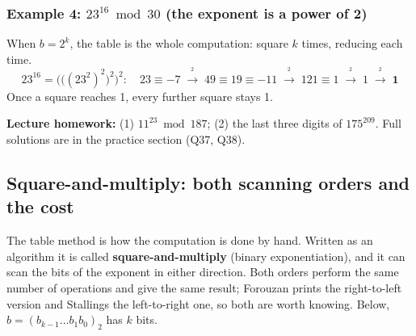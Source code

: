 \subsubsection*{Example 4: $23^{16} \bmod 30$ (the exponent is a power of 2)}
When $b = 2^k$, the table is the whole computation: square $k$ times, reducing each time.
\[
23^{16} = \Big(\big((23^2)^2\big)^2\Big)^2:\quad 23 \equiv -7 \;\xrightarrow{\;^2\;}\; 49 \equiv 19 \equiv -11 \;\xrightarrow{\;^2\;}\; 121 \equiv 1 \;\xrightarrow{\;^2\;}\; 1 \;\xrightarrow{\;^2\;}\; \mathbf{1}
\]
Once a square reaches 1, every further square stays 1.

\textbf{Lecture homework:} (1) $11^{23} \bmod 187$; (2) the last three digits of $175^{209}$. Full solutions are in the practice section (Q37, Q38).

\subsection{Square-and-multiply: both scanning orders and the cost \hot}
The table method is how the computation is done by hand. Written as an algorithm it is called \textbf{square-and-multiply} (binary exponentiation), and it can scan the bits of the exponent in either direction. Both orders perform the same number of operations and give the same result; Forouzan prints the right-to-left version and Stallings the left-to-right one, so both are worth knowing. Below, $b = (b_{k-1} \dots b_1 b_0)_2$ has $k$ bits.
